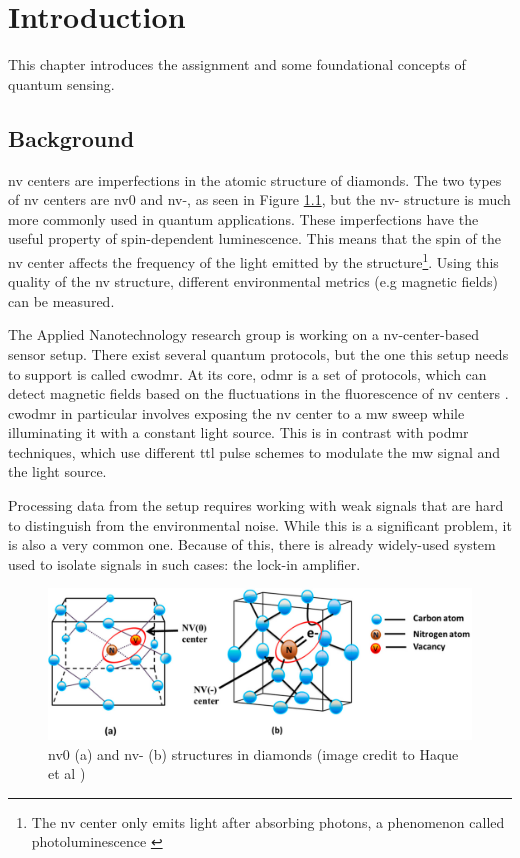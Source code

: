 \chapter{Introduction}
This chapter introduces the assignment and some foundational concepts of quantum sensing.

\section{Background}\label{chap:background}
\gls{nv} centers \cite{enwiki:1301369588} are imperfections in the atomic structure of diamonds. The two types of \gls{nv} centers are \gls{nv}0 and \gls{nv}-, as seen in Figure \ref{fig:nvcenter}, but the \gls{nv}- structure is much more commonly used in quantum applications. These imperfections have the useful property of spin-dependent luminescence. This means that the spin of the \gls{nv} center affects the frequency of the light emitted by the structure\footnote{The \gls{nv} center only emits light after absorbing photons, a phenomenon called photoluminescence \cite{enwiki:1309081879}}. Using this quality of the \gls{nv} structure, different environmental metrics (e.g magnetic fields) can be measured. 

The Applied Nanotechnology research group is working on a \gls{nv}-center-based sensor setup. There exist several quantum protocols, but the one this setup needs to support is called \gls{cwodmr}. At its core, \gls{odmr} is a set of protocols, which can detect magnetic fields based on the fluctuations in the fluorescence of \gls{nv} centers \cite{enwiki:1301371272}. \gls{cwodmr} in particular involves exposing the \gls{nv} center to a \gls{mw} sweep while illuminating it with a constant light source. This is in contrast with \gls{podmr} techniques, which use different \gls{ttl} pulse schemes \cite{sewani2020coherent} to modulate the \gls{mw} signal and the light source.

Processing data from the setup requires working with weak signals that are hard to distinguish from the environmental noise. While this is a significant problem, it is also a very common one. Because of this, there is already widely-used system used to isolate signals in such cases: the lock-in amplifier.

\begin{figure}[ht]
	\centering
	\includegraphics[width=0.7\linewidth]{img/nv_center}
	\caption{\gls{nv}0 (a) and \gls{nv}- (b) structures in diamonds (image credit to Haque et al \cite{haque2017overview})}
	\label{fig:nvcenter}
\end{figure}


